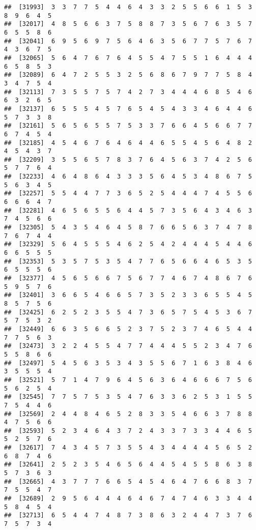 \documentclass[
]{book}
\begin{document}
\begin{verbatim}
##  [31993]  3  3  7  7  5  4  4  6  4  3  3  2  5  5  6  6  1  5  3  8  9  6  4  5
##  [32017]  4  8  5  6  6  3  7  5  8  8  7  3  5  6  7  6  3  5  7  6  5  5  8  6
##  [32041]  6  9  5  6  9  7  5  6  4  6  3  5  6  7  7  5  7  6  7  4  3  6  7  5
##  [32065]  5  6  4  7  6  7  6  4  5  5  4  7  5  5  1  6  4  4  4  6  5  8  5  3
##  [32089]  6  4  7  2  5  5  3  2  5  6  8  6  7  9  7  7  5  8  4  3  4  7  5  4
##  [32113]  7  3  5  5  7  5  7  4  2  7  3  4  4  4  6  8  5  4  6  6  3  2  6  5
##  [32137]  6  5  5  5  4  5  7  6  5  4  5  4  3  3  4  6  4  4  6  5  7  3  3  8
##  [32161]  5  6  5  6  5  5  7  5  3  3  7  6  6  4  5  6  6  7  7  6  7  4  5  4
##  [32185]  4  5  4  6  7  6  4  6  4  4  6  5  5  4  5  6  4  8  2  4  5  4  3  7
##  [32209]  3  5  5  6  5  7  8  3  7  6  4  5  6  3  7  4  2  5  6  5  7  7  6  4
##  [32233]  4  6  4  8  6  4  3  3  3  5  6  4  5  3  4  8  6  7  5  5  6  3  4  5
##  [32257]  5  5  4  4  7  7  3  6  5  2  5  4  4  4  7  4  5  5  6  6  6  6  4  7
##  [32281]  4  6  5  6  5  5  6  4  4  5  7  3  5  6  4  3  4  6  3  7  4  5  6  6
##  [32305]  5  4  3  5  4  6  4  5  8  7  6  6  5  6  3  7  4  7  8  7  6  7  4  4
##  [32329]  5  6  4  5  5  5  4  6  2  5  4  2  4  4  4  5  4  4  6  6  6  5  5  5
##  [32353]  5  3  5  7  5  3  5  4  7  7  6  5  6  6  4  6  5  3  5  6  5  5  5  6
##  [32377]  4  5  6  5  6  6  7  5  6  7  7  4  6  7  4  8  6  7  6  5  9  5  7  6
##  [32401]  3  6  6  5  4  6  6  5  7  3  5  2  3  3  6  5  5  4  5  8  5  7  5  6
##  [32425]  6  2  5  2  3  5  5  4  7  3  6  5  7  5  4  5  3  6  7  5  7  5  3  2
##  [32449]  6  6  3  5  6  6  5  2  3  7  5  2  3  7  4  6  5  4  4  7  7  5  6  3
##  [32473]  3  2  2  4  5  5  4  7  7  4  4  4  5  5  2  3  4  7  6  5  5  8  6  6
##  [32497]  5  4  5  6  3  5  3  4  3  5  5  6  7  1  6  3  8  4  6  3  5  5  5  4
##  [32521]  5  7  1  4  7  9  6  4  5  6  3  6  4  6  6  6  7  5  6  5  6  2  5  4
##  [32545]  7  7  5  7  5  3  5  4  7  6  3  3  6  2  5  3  1  5  5  7  5  4  4  6
##  [32569]  2  4  4  8  4  6  5  2  8  3  3  5  4  6  6  3  7  8  8  4  7  5  6  6
##  [32593]  5  2  3  4  6  4  3  7  2  4  3  3  7  3  3  4  4  6  5  5  2  5  7  6
##  [32617]  7  4  3  4  5  7  3  5  5  4  3  4  4  4  4  5  6  5  2  6  8  7  4  6
##  [32641]  2  5  2  3  5  4  6  5  6  4  4  5  4  5  5  8  6  3  8  5  7  3  6  3
##  [32665]  4  3  7  7  7  6  6  5  4  5  4  6  4  7  6  6  8  3  7  7  5  5  4  7
##  [32689]  2  9  5  6  4  4  4  6  4  6  7  4  7  4  6  3  3  4  4  5  8  4  5  4
##  [32713]  6  5  4  4  7  4  8  7  3  8  6  3  2  4  4  7  3  7  6  7  5  7  3  4

\end{verbatim}
\end{document}
